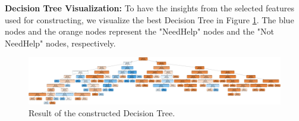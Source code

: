 \documentclass[11pt]{article}
\begin{document}
\begin{itemize}
\textbf{Decision Tree Visualization:}
To have the insights from the selected features used for constructing, we visualize the best Decision Tree in Figure \ref{fig:decison_tree_graphic}.
The blue nodes and the orange nodes represent the "NeedHelp" nodes and the "Not NeedHelp" nodes, respectively.

\begin{figure}[h]
\centering 
\includegraphics[width=\linewidth]{decison_tree_graphic.png}
\caption{Result of the constructed Decision Tree.}
  \label{fig:decison_tree_graphic}
\end{figure}


\end{itemize}
\end{document}

